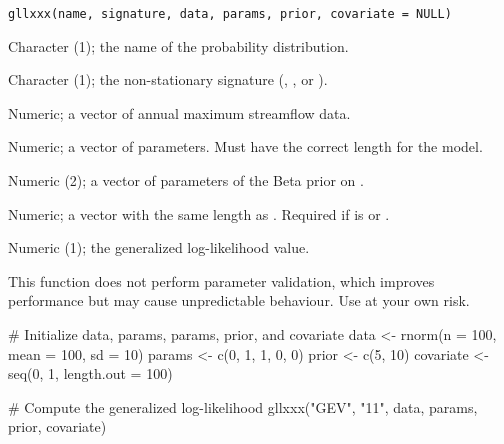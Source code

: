 \documentclass[a4paper]{book}
\begin{document}
%
\begin{Usage}
\begin{verbatim}
gllxxx(name, signature, data, params, prior, covariate = NULL)
\end{verbatim}
\end{Usage}
%
\begin{Arguments}
\begin{ldescription}
\item[\code{name}] Character (1); the name of the probability distribution.

\item[\code{signature}] Character (1); the non-stationary signature (, , or ).

\item[\code{data}] Numeric; a vector of annual maximum streamflow data.

\item[\code{params}] Numeric; a vector of parameters. Must have the correct length for the model.

\item[\code{prior}] Numeric (2); a vector of parameters  of the Beta prior
on \eqn{\kappa}{}.

\item[\code{covariate}] Numeric; a vector with the same length as .
Required if  is  or .
\end{ldescription}
\end{Arguments}
%
\begin{Value}
Numeric (1); the generalized log-likelihood value.
\end{Value}
%
\begin{Note}
This function does not perform parameter validation, which improves performance
but may cause unpredictable behaviour. Use at your own risk.
\end{Note}
%
\begin{SeeAlso}
\end{SeeAlso}
%
\begin{Examples}
\begin{ExampleCode}
# Initialize data, params, params, prior, and covariate
data <- rnorm(n = 100, mean = 100, sd = 10)
params <- c(0, 1, 1, 0, 0)
prior <- c(5, 10)
covariate <- seq(0, 1, length.out = 100)

# Compute the generalized log-likelihood
gllxxx("GEV", "11", data, params, prior, covariate)

\end{ExampleCode}
\end{Examples}
\end{document}
